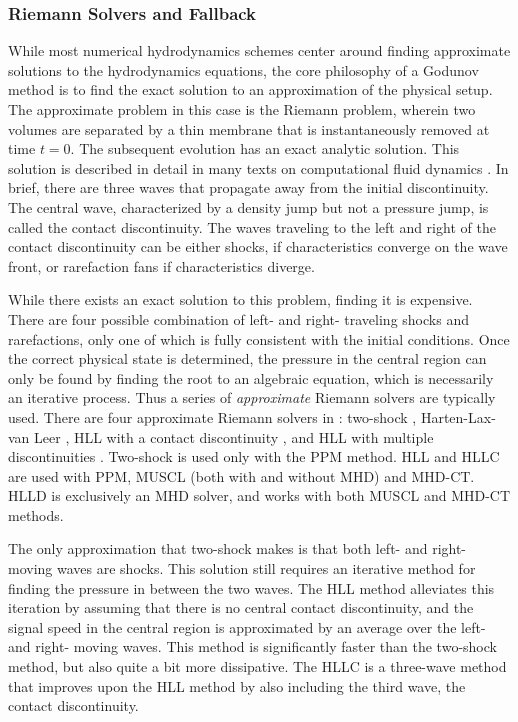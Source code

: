 \subsubsection{Riemann Solvers and Fallback}
\label{sec.riemann}

While most numerical hydrodynamics schemes center around finding approximate
solutions to the hydrodynamics equations, the core philosophy of a Godunov
method \citep{Godunov1959} is to find the exact solution to an
approximation of the physical setup.  The approximate problem in this case is
the Riemann problem, wherein two volumes are separated by a thin membrane that
is instantaneously removed at time $t=0$.  The subsequent evolution has an exact 
analytic solution.  This solution is
described in detail in many texts on computational fluid dynamics
\citep[e.g.,][]{toro-1997}.   In brief, there are three waves that propagate
away from the initial discontinuity.  The central wave, characterized by a
density jump but not a pressure jump, is called the contact discontinuity.  The
waves traveling to the left and right of the contact discontinuity can be either
shocks, if characteristics converge on the wave front, or  rarefaction fans if
characteristics diverge.  

While there exists an exact solution to this problem, finding it is expensive.  There are four
possible combination of left- and right- traveling shocks and rarefactions,
only one of which is fully consistent with the initial conditions.  Once the
correct physical state is determined, the pressure in the central region can
only be found by finding the root to an algebraic equation, which is necessarily
an iterative process.  Thus a series of \emph{approximate} Riemann solvers are
typically used.  There are four approximate Riemann solvers in \enzo: two-shock
\citep{toro-1997},
Harten-Lax-van Leer \citep[HLL,][]{toro-1997}, HLL with a contact discontinuity
 \citep[HLLC,][]{toro-1997}, and HLL with
multiple discontinuities \citep[HLLD,][]{Miyoshi05}.  Two-shock is used only
with the PPM method.  HLL and HLLC are used with PPM, MUSCL (both with and
without MHD) and MHD-CT.  HLLD is exclusively an MHD solver, and works with both
MUSCL and MHD-CT methods.  

The only approximation that two-shock makes is that both left- and right- moving
waves are shocks.  This solution still requires an iterative method for finding
the pressure in between the two waves.  The HLL method alleviates this iteration
by assuming that there is no central contact discontinuity, and the signal speed
in the central region is approximated by an average over the left- and right-
moving waves.  This method is significantly faster than the two-shock method,
but also quite a bit more dissipative.  The HLLC is a three-wave method that improves upon the HLL
method by also including the third wave, the contact discontinuity.  

